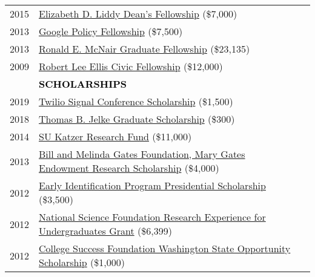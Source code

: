 \documentclass[11pt]{article}
\begin{document}
{{\begin{longtable}{Rp{0.75in}p{5.0in}}
\footnotesize{2015} & \href{https://news.syr.edu/2012/04/ischool-advisersu-trustee-creates-new-summer-ph-d-fellowships/}{{Elizabeth D. Liddy Dean's Fellowship}} (\$7,000)\\

\footnotesize{2013} & \href{https://www.google.com/policyfellowship/2013fellows.html}{{Google Policy Fellowship}} (\$7,500)\\

\footnotesize{2013} & \href{https://www.syracuse.edu/admissions/cost-and-aid/types-of-aid/graduate-student-aid/fellowships/}{{Ronald E. McNair Graduate Fellowship}} (\$23,135)\\

\footnotesize{2009} & \href{https://www.washington.edu/uaa/2010/04/22/uw-celebrates-undergraduate-leadership-and-civic-engagement/}{{Robert Lee Ellis Civic Fellowship}} (\$12,000)\\

& \textcolor{black}{\uppercase{\textbf{Scholarships}}}\\

\footnotesize{2019} & \href{https://signal.twilio.com/}{{Twilio Signal Conference Scholarship}} (\$1,500)\\

\footnotesize{2018} & \href{https://www.afa1976.org/foundation}{{Thomas B. Jelke Graduate Scholarship}} (\$300)\\

\footnotesize{2014} & \href{https://youtu.be/kFmO44rs3-c}{{SU Katzer Research Fund}} (\$11,000)\\

\footnotesize{2013} & \href{https://expo.uw.edu/public/offering/271}{{Bill and Melinda Gates Foundation, Mary Gates Endowment Research Scholarship}} (\$4,000)\\

\footnotesize{2012} & \href{https://expo.uw.edu/expo/apply/278/proceedings/offering_session/510}{{Early Identification Program Presidential Scholarship}} (\$3,500)\\

\footnotesize{2012} & \href{https://www.nsf.gov/crssprgm/reu/}{{National Science Foundation Research Experience for Undergraduates Grant}} (\$6,399)\\

\footnotesize{2012} & \href{https://www.waopportunityscholarship.org/}{{College Success Foundation Washington State Opportunity Scholarship}} (\$1,000)\\


\end{longtable}}}
\end{document}
